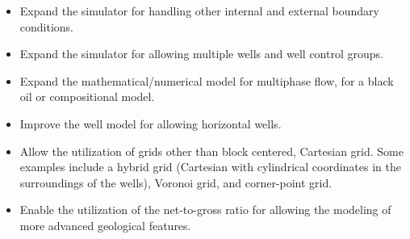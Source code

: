 \begin{itemize}
	\item Expand the simulator for handling other internal and external boundary conditions.
	
	\item Expand the simulator for allowing multiple wells and well control groups.
	
	\item Expand the mathematical/numerical model for multiphase flow, for a black oil or compositional model.
	
	\item Improve the well model for allowing horizontal wells.
	
	\item Allow the utilization of grids other than block centered, Cartesian grid. Some examples include a hybrid grid (Cartesian with cylindrical coordinates in the surroundings of the wells), Voronoi grid, and corner-point grid.
	
	\item Enable the utilization of the net-to-gross ratio for allowing the modeling of more advanced geological features.
\end{itemize}


